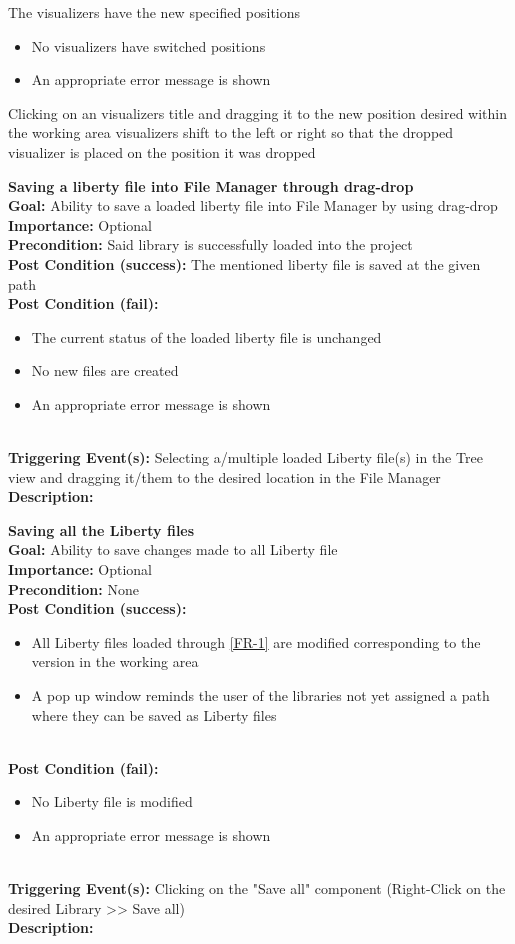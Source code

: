 \documentclass[10pt,a4paper]{report}
\newcommand{\precondition}[1]{
    \textbf{Precondition: } #1 \leavevmode \\
}
\newcommand{\FRDescription}[8]{
    \textbf{#1} \leavevmode \\
    \textbf{Goal: } #2 \leavevmode \\
    \textbf{Importance: } #3 \leavevmode \\
    \precondition{#4}
    \textbf{Post Condition (success): } #5 \leavevmode \\
    \textbf{Post Condition (fail): } #6 \leavevmode \\
    \textbf{Triggering Event(s): } #7 \leavevmode \\
    \textbf{Description: } \leavevmode \\ 
    #8}
\newcommand{\FRODescription}[8]{
    \textbf{#1} \leavevmode \\
    \textbf{Goal: } #2 \leavevmode \\
    \textbf{Importance: } #3 \leavevmode \\
    \precondition{#4}
    \textbf{Post Condition (success): } #5 \leavevmode \\
    \textbf{Post Condition (fail): } #6 \leavevmode \\
    \textbf{Triggering Event(s): } #7 \leavevmode \\
    \textbf{Description: } \leavevmode \\
    #8}
\begin{document}
\begin{FRO}
    {The visualizers have the new specified positions}
    {\begin{itemize}
        \item No visualizers have switched positions
        \item An appropriate error message is shown
    \end{itemize}}
    {Clicking on an visualizers title and dragging it to the new position desired within the working area}
    {visualizers shift to the left or right so that the dropped visualizer is placed on the position it was dropped}
    \item \FRODescription{Saving a liberty file into File Manager through drag-drop\label{FRO-9}}
    {Ability to save a loaded liberty file into File Manager by using drag-drop}
    {Optional}
    {Said library is successfully loaded into the project}
    {The mentioned liberty file is saved at the given path}
    {\begin{itemize}
        \item The current status of the loaded liberty file is unchanged
        \item No new files are created
        \item An appropriate error message is shown
    \end{itemize}}
    {Selecting a/multiple loaded Liberty file(s) in the Tree view and dragging it/them to the desired location in the File Manager}
    \item \FRDescription{Saving all the Liberty files\label{FRO-10}}
    {Ability to save changes made to all Liberty file}
    {Optional}
    {None}
    {\begin{itemize}
        \item All Liberty files loaded through \ref{FR-1} are modified corresponding to the version in the working area
        \item A pop up window reminds the user of the libraries not yet assigned a path where they can be saved as Liberty files
    \end{itemize}}
    {\begin{itemize}
        \item No Liberty file is modified
        \item An appropriate error message is shown
    \end{itemize}}
    {Clicking on the "Save all" component (Right-Click on the desired Library  >> Save all)}
    \item {}

\end{FRO}
\end{document}
